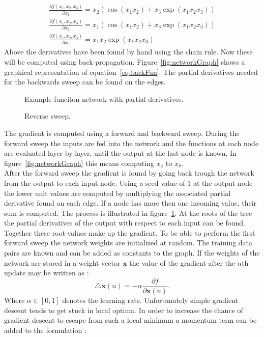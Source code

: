 \begin{align}
\frac{\partial f(x_1,x_2,x_3)}{\partial x_1} = x_2 (\cos(x_1 x_2) + x_3 \exp(x_1 x_2 x_3)) \\
\frac{\partial f(x_1,x_2,x_3)}{\partial x_2} = x_1 (\cos(x_1 x_2) + x_3 \exp(x_1 x_2 x_3)) \\
\frac{\partial f(x_1,x_2,x_3)}{\partial x_3} = x_1  x_2 \exp(x_1 x_2 x_3)
\end{align}
Above the derivatives have been found by hand using the chain rule. Now these will be computed using back-propagation. Figure~\ref{fig:networkGraph} shows a graphical representation of equation~\ref{eq:backFun}. The partial derivatives needed for the backwards sweep can be found on the edges. \\
\begin{figure}
\centering

\caption{Example funciton network with partial derivatives.}
\label{fig:networkGraph}

\caption{Reverse sweep.}
\label{fig:reverseSweep}
\end{figure}
The gradient is computed using a forward and backward sweep. During the forward sweep the inputs are fed into the network and the functions at each node are evaluated layer by layer, until the output at the last node is known. In figure~\ref{fig:networkGraph} this means computing $x_4$ to $x_8$. \\
After the forward sweep the gradient is found by going back trough the network from the output to each input node. Using a seed value of $1$ at the output node the lower unit values are computed by multiplying the associated partial derivative found on each edge. If a node has more then one incoming value, their sum is computed. The process is illustrated in figure~\ref{fig:reverseSweep}. At the roots of the tree the partial derivatives of the output with respect to each input can be found. Together these root values make up the gradient.
To be able to perform the first forward sweep the network weights are initialized at random. The training data pairs are known and can be added as constants to the graph.
If the weights of the network are stored in a weight vector $\mathbf{x}$ the value of the gradient after the $n$th update may be written as \cite[page 27]{Graves2008}:
\begin{equation}
\triangle \mathbf{x}(n) = -\alpha \frac{\partial f}{\partial \mathbf{x}(n)}.
\end{equation}
Where $\alpha \in [0,1]$ denotes the learning rate. Unfortunately simple gradient descent tends to get stuck in local optima. In order to increase the chance of gradient descent to escape from such a local minimum a momentum term can be added to the formulation \cite[page 267]{Bishop1995}\cite[page 27]{Graves2008}:

